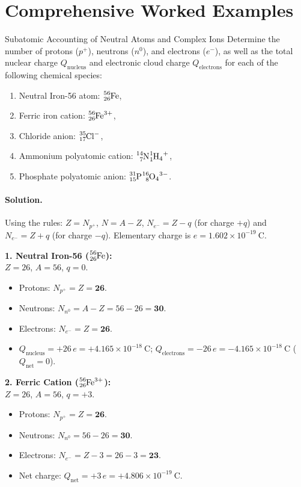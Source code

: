 \section{Comprehensive Worked Examples}

\begin{workedexample}{Subatomic Accounting of Neutral Atoms and Complex Ions}
Determine the number of protons ($p^+$), neutrons ($n^0$), and electrons ($e^-$), as well as the total nuclear charge $Q_{\text{nucleus}}$ and electronic cloud charge $Q_{\text{electrons}}$ for each of the following chemical species:
\begin{enumerate}[leftmargin=1.4em,itemsep=2pt]
  \item Neutral Iron-56 atom: $\ce{^{56}_{26}Fe}$,
  \item Ferric iron cation: $\ce{^{56}_{26}Fe^{3+}}$,
  \item Chloride anion: $\ce{^{35}_{17}Cl^-}$,
  \item Ammonium polyatomic cation: $\ce{^{14}_7N^1_1H_4^+}$,
  \item Phosphate polyatomic anion: $\ce{^{31}_{15}P^{16}_8O_4^{3-}}$.
\end{enumerate}

\paragraph{Solution.}
Using the rules: $Z = N_{p^+}$, $N = A - Z$, $N_{e^-} = Z - q$ (for charge $+q$) and $N_{e^-} = Z + q$ (for charge $-q$).
Elementary charge is $e = 1.602 \times 10^{-19}\ \mathrm{C}$.

\textbf{1. Neutral Iron-56 ($\ce{^{56}_{26}Fe}$):}\\
$Z = 26$, $A = 56$, $q = 0$.
\begin{itemize}[leftmargin=1.5em,itemsep=1pt]
  \item Protons: $N_{p^+} = Z = \mathbf{26}$.
  \item Neutrons: $N_{n^0} = A - Z = 56 - 26 = \mathbf{30}$.
  \item Electrons: $N_{e^-} = Z = \mathbf{26}$.
  \item $Q_{\text{nucleus}} = +26\,e = +4.165 \times 10^{-18}\ \mathrm{C}$; $Q_{\text{electrons}} = -26\,e = -4.165 \times 10^{-18}\ \mathrm{C}$ ($Q_{\text{net}} = 0$).
\end{itemize}

\textbf{2. Ferric Cation ($\ce{^{56}_{26}Fe^{3+}}$):}\\
$Z = 26$, $A = 56$, $q = +3$.
\begin{itemize}[leftmargin=1.5em,itemsep=1pt]
  \item Protons: $N_{p^+} = Z = \mathbf{26}$.
  \item Neutrons: $N_{n^0} = 56 - 26 = \mathbf{30}$.
  \item Electrons: $N_{e^-} = Z - 3 = 26 - 3 = \mathbf{23}$.
  \item Net charge: $Q_{\text{net}} = +3\,e = +4.806 \times 10^{-19}\ \mathrm{C}$.
\end{itemize}


\end{workedexample}
